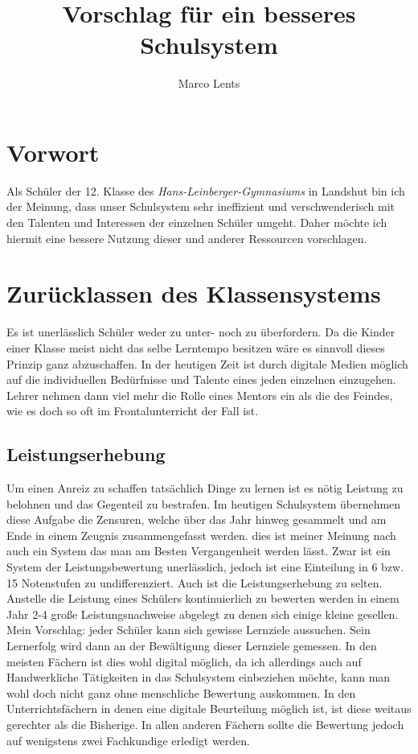\documentclass[12pt,a4paper]{article}
\author{Marco Lents}
\title{Vorschlag für ein besseres Schulsystem}
\begin{document}
\maketitle
\newpage
\tableofcontents
\newpage


\section{Vorwort}
Als Schüler der 12. Klasse des \emph{Hans-Leinberger-Gymnasiums} in Landshut bin ich der Meinung, dass unser Schulsystem sehr ineffizient und verschwenderisch mit den Talenten und Interessen der einzelnen Schüler umgeht. Daher möchte ich hiermit eine bessere Nutzung dieser und anderer Ressourcen vorschlagen.

\section{Zurücklassen des Klassensystems}
Es ist unerlässlich Schüler weder zu unter- noch zu überfordern. Da die Kinder einer Klasse meist nicht das selbe Lerntempo besitzen wäre es sinnvoll dieses Prinzip ganz abzuschaffen. In der heutigen Zeit ist durch digitale Medien möglich auf die individuellen Bedürfnisse und Talente eines jeden einzelnen einzugehen. Lehrer nehmen dann viel mehr die Rolle eines Mentors ein als die des Feindes, wie es doch so oft im Frontalunterricht der Fall ist.

\subsection{Leistungserhebung}
Um einen Anreiz zu schaffen tatsächlich Dinge zu lernen ist es nötig Leistung zu belohnen und das Gegenteil zu bestrafen. Im heutigen Schulsystem übernehmen diese Aufgabe die Zensuren, welche über das Jahr hinweg gesammelt und am Ende in einem Zeugnis zusammengefasst werden. dies ist meiner Meinung nach auch ein System das man am Besten Vergangenheit werden lässt. Zwar ist ein System der Leistungsbewertung unerlässlich, jedoch ist eine Einteilung in 6 bzw. 15 Notenstufen zu undifferenziert. Auch ist die Leistungserhebung zu selten. Anstelle die Leistung eines Schülers kontinuierlich zu bewerten werden in einem Jahr 2-4 große Leistungsnachweise abgelegt zu denen sich einige kleine gesellen. Mein Vorschlag: jeder Schüler kann sich gewisse Lernziele aussuchen. Sein Lernerfolg wird dann an der Bewältigung dieser Lernziele gemessen. In den meisten Fächern ist dies wohl digital möglich, da ich allerdings auch auf Handwerkliche Tätigkeiten in das Schulsystem einbeziehen möchte, kann man wohl doch nicht ganz ohne menschliche Bewertung auskommen. In den Unterrichtsfächern in denen eine digitale Beurteilung möglich ist, ist diese weitaus gerechter als die Bisherige. In allen anderen Fächern sollte die Bewertung jedoch auf wenigstens zwei Fachkundige erledigt werden.
\end{document}
